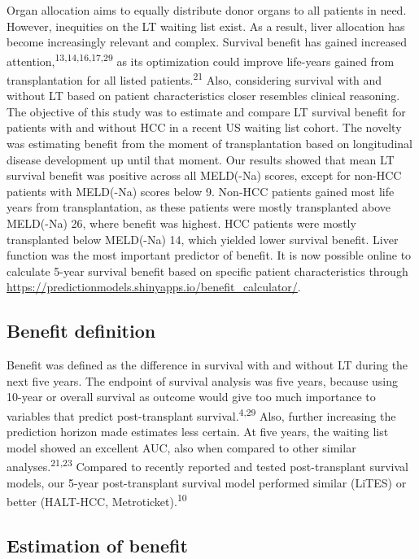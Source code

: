 \documentclass[11pt,english,]{book} %
\begin{document}
Organ allocation aims to equally distribute donor organs to all patients in need. However, inequities on the LT waiting list exist. As a result, liver allocation has become increasingly relevant and complex. Survival benefit has gained increased attention,\textsuperscript{13,14,16,17,29} as its optimization could improve life-years gained from transplantation for all listed patients.\textsuperscript{21} Also, considering survival with and without LT based on patient characteristics closer resembles clinical reasoning.
The objective of this study was to estimate and compare LT survival benefit for patients with and without HCC in a recent US waiting list cohort. The novelty was estimating benefit from the moment of transplantation based on longitudinal disease development up until that moment. Our results showed that mean LT survival benefit was positive across all MELD(-Na) scores, except for non-HCC patients with MELD(-Na) scores below 9. Non-HCC patients gained most life years from transplantation, as these patients were mostly transplanted above MELD(-Na) 26, where benefit was highest. HCC patients were mostly transplanted below MELD(-Na) 14, which yielded lower survival benefit. Liver function was the most important predictor of benefit. It is now possible online to calculate 5-year survival benefit based on specific patient characteristics through \url{https://predictionmodels.shinyapps.io/benefit_calculator/}.

\hypertarget{benefit-definition-1}{%
\subsection*{Benefit definition}\label{benefit-definition-1}}

Benefit was defined as the difference in survival with and without LT during the next five years. The endpoint of survival analysis was five years, because using 10-year or overall survival as outcome would give too much importance to variables that predict post-transplant survival.\textsuperscript{4,29} Also, further increasing the prediction horizon made estimates less certain. At five years, the waiting list model showed an excellent AUC, also when compared to other similar analyses.\textsuperscript{21,23} Compared to recently reported and tested post-transplant survival models, our 5-year post-transplant survival model performed similar (LiTES) or better (HALT-HCC, Metroticket).\textsuperscript{10}

\hypertarget{estimation-of-benefit}{%
\subsection*{Estimation of benefit}\label{estimation-of-benefit}}
\end{document}
